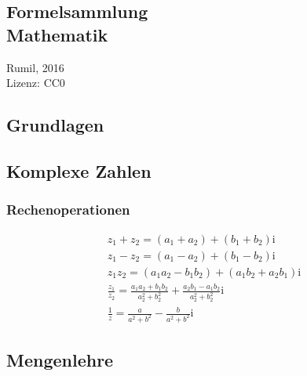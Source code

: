 \documentclass[a4paper,10pt,fleqn,onecolumn,twoside]{book}
\numberwithin{equation}{chapter}
\newcommand{\ui}{\mathrm i}
\begin{document}
\section*{Formelsammlung\\
Mathematik}
Rumil, 2016\\
Lizenz: CC0

\tableofcontents

\begin{multicols}{2}
\chapter{Grundlagen}
\section{Komplexe Zahlen}
\subsection{Rechenoperationen}

\begin{gather}
z_1+z_2 = (a_1+a_2)+(b_1+b_2)\ui\\
z_1-z_2 = (a_1-a_2)+(b_1-b_2)\ui\\
z_1 z_2 = (a_1 a_2 - b_1 b_2)+(a_1 b_2+a_2 b_1)\ui\\
\frac{z_1}{z_2}
= \frac{a_1 a_2 + b_1 b_2}{a_2^2+b_2^2}
+ \frac{a_2 b_1 - a_1 b_2}{a_2^2+b_2^2}\ui\\
\frac{1}{z} = \frac{a}{a^2+b^2}-\frac{b}{a^2+b^2}\ui
\end{gather}

\end{multicols}
\section{Mengenlehre}
\end{document}
